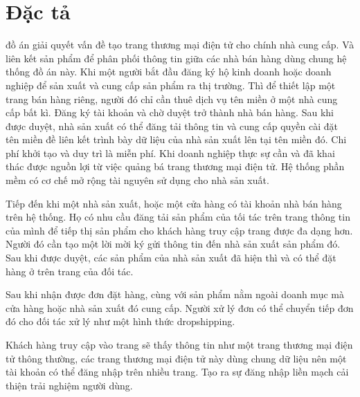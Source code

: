 \fontsize{13px}{13px}\selectfont\justifying
\section{Đặc tả}
đồ án giải quyết vấn đề tạo trang thương mại điện tử cho chính nhà cung cấp. Và liên kết sản phẩm để phân phối thông tin giữa các nhà bán hàng dùng chung hệ thống đồ án này. Khi một người bắt đầu đăng ký hộ kinh doanh hoặc doanh nghiệp để sản xuất và cung cấp sản phẩm ra thị trường. Thì để thiết lập một trang bán hàng riêng, người đó chỉ cần thuê dịch vụ tên miền ở một nhà cung cấp bất kì. Đăng ký tài khoản và chờ duyệt trở thành nhà bán hàng. Sau khi được duyệt, nhà sản xuất có thể đăng tải thông tin và cung cấp quyền cài đặt tên miền đề liên kết trình bày dữ liệu của nhà sản xuất lên tại tên miền đó. Chi phí khởi tạo và duy trì là miễn phí. Khi doanh nghiệp thực sự cần và đã khai thác được nguồn lợi từ việc quảng bá trang thương mại điện tử. Hệ thống phần mềm có cơ chế mở rộng tài nguyên sử dụng cho nhà sản xuất.

Tiếp đến khi một nhà sản xuất, hoặc một cửa hàng có tài khoản nhà bán hàng trên hệ thống. Họ có nhu cầu đăng tải sản phẩm của tối tác trên trang thông tin của mình để tiếp thị sản phẩm cho khách hàng truy cập trang được đa dạng hơn. Người đó cần tạo một lời mời ký gửi thông tin đến nhà sản xuất sản phẩm đó. Sau khi được duyệt, các sản phẩm của nhà sản xuất đã hiện thì và có thể đặt hàng ở trên trang của đối tác.

Sau khi nhận được đơn đặt hàng, cùng với sản phẩm nằm ngoài doanh mục mà cửa hàng hoặc nhà sản xuất đó cung cấp. Người xử lý đơn có thể chuyển tiếp đơn đó cho đối tác xử lý như một hình thức \gls{dropshipping}.

Khách hàng truy cập vào trang sẽ thấy thông tin như một trang thương mại điện tử thông thường, các trang thương mại điện tử này dùng chung dữ liệu nên một tài khoản có thể đăng nhập trên nhiều trang. Tạo ra sự đăng nhập liền mạch cải thiện trải nghiệm người dùng.

